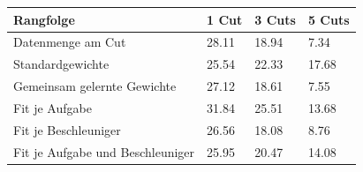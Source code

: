 \begin{tabular}{@{}llll@{}}
\toprule
Rangfolge & 1 Cut & 3 Cuts & 5 Cuts \\
\midrule
Datenmenge am Cut & 28.11 & 18.94 & 7.34 \\
Standardgewichte & 25.54 & 22.33 & 17.68 \\
Gemeinsam gelernte Gewichte & 27.12 & 18.61 & 7.55 \\
Fit je Aufgabe & 31.84 & 25.51 & 13.68 \\
Fit je Beschleuniger & 26.56 & 18.08 & 8.76 \\
Fit je Aufgabe und Beschleuniger & 25.95 & 20.47 & 14.08 \\
\bottomrule
\end{tabular}
